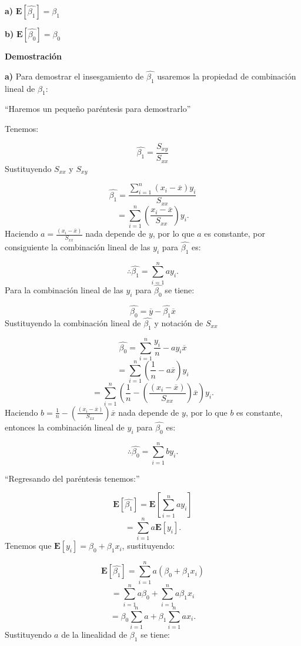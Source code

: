 \documentclass[
  a4paper,
  oneside,
  openany]{book}
\begin{document}
\textbf{a)} \(\mathbf{E}\left[\hat{\beta_{1}}\right]=\beta_{1}\)

\textbf{b)} \(\mathbf{E}\left[\hat{\beta_{0}}\right]=\beta_{0}\)

\textbf{Demostración}

\textbf{a)} Para demostrar el insesgamiento de \(\hat{\beta_{1}}\) usaremos la propiedad de combinación lineal de \(\beta_{1}:\)

``Haremos un pequeño paréntesis para demostrarlo''

Tenemos:

\[\hat{\beta_{1}}=\frac{S_{xy}}{S_{xx}}\]
Sustituyendo \(S_{xx}\) y \(S_{xy}\)

\[\hat{\beta_{1}}=\frac{\sum_{i=1}^{n}(x_{i}-\overline{x})y_{i}}{S_{xx}}\]
\[=\sum_{i=1}^{n}\left(\frac{x_{i}-\overline{x}}{S_{xx}}\right)y_{i}.\]
Haciendo \(a=\frac{(x_{i}-\overline{x})}{S_{xx}}\) nada depende de \(y\), por lo que \(a\) es constante, por consiguiente la combinación lineal de las \(y_{i}\) para \(\hat{\beta_{1}}\) es:

\[\therefore \hat{\beta_{1}}=\sum_{i=1}^{n}ay_{i}.\]
Para la combinación lineal de las \(y_{i}\) para \(\hat{\beta_{0}}\) se tiene:

\[\hat{\beta_{0}}=\overline{y}-\hat{\beta_{1}}\overline{x}\]
Sustituyendo la combinación lineal de \(\hat{\beta_{1}}\) y notación de \(S_{xx}\)

\[\hat{\beta_{0}}=\sum_{i=1}^{n}\frac{y_{i}}{n}-ay_{i}\overline{x}\]
\[=\sum_{i=1}^{n}(\frac{1}{n}-a\overline{x})y_{i}\]
\[=\sum_{i=1}^{n}\left(\frac{1}{n}-\left(\frac{(x_{i}-\overline{x})}{S_{xx}}\right)\overline{x}\right)y_{i}. \]
Haciendo \(b=\frac{1}{n}-\left(\frac{(x_{i}-\overline{x})}{S_{xx}}\right)\overline{x}\) nada depende de \(y\), por lo que \(b\) es constante, entonces la combinación lineal de \(y_{i}\) para \(\hat{\beta_{0}}\) es:

\[\therefore \hat{\beta_{0}}=\sum_{i=1}^{n}by_{i}.\]

``Regresando del paréntesis tenemos:''

\[\mathbf{E}\left[\hat{\beta_{1}}\right]=\mathbf{E}\left[\sum_{i=1}^{n}ay_{i}\right]\]
\[=\sum_{i=1}^{n}a\mathbf{E}[y_{i}].\]
Tenemos que \(\mathbf{E}[y_{i}]=\beta_{0}+\beta_{1}x_{i}\), sustituyendo:

\[\mathbf{E}\left[\hat{\beta_{1}}\right]=\sum_{i=1}^{n}a(\beta_{0}+\beta_{1}x_{i})\]
\[=\sum_{i=1}^{n}a\beta_{0}+\sum_{i=1}^{n}a\beta_{1}x_{i}\]
\[=\beta_{0}\sum_{i=1}^{n}a+\beta_{1}\sum_{i=1}^{n}ax_{i}.\]
Sustituyendo \(a\) de la linealidad de \(\beta_{1}\) se tiene:
\end{document}
